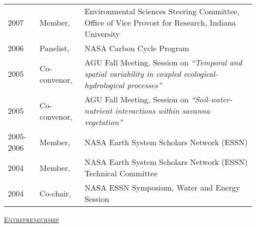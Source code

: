 \documentclass[10pt]{article}
\begin{document}
\begin{longtable}{p{.75in} p{1in} p{4.5in}}
2007 & Member, & Environmental Sciences Steering Committee, Office of Vice Provost for Research,  Indiana University  \\ 
2006 & Panelist, & NASA Carbon Cycle Program \\
2005 & Co-convenor, &  AGU Fall Meeting, Session on \emph{``Temporal and spatial variability in coupled ecological-hydrological processes''} \\
2005 & Co-convenor, &  AGU Fall Meeting, Session on \emph{``Soil-water-nutrient interactions within savanna vegetation''}  \\
2005-2006 & Member, &  NASA Earth System Scholars Network (ESSN)    \\ 
2004 & Member, &  NASA Earth System Scholars Network (ESSN) Technical Committee \\
2004 & Co-chair, &  NASA ESSN Symposium, Water and Energy Session \\



\end{longtable}

\vspace*{.1in}
\textsc{\underline{Entrepreneurship}}
\end{document}
